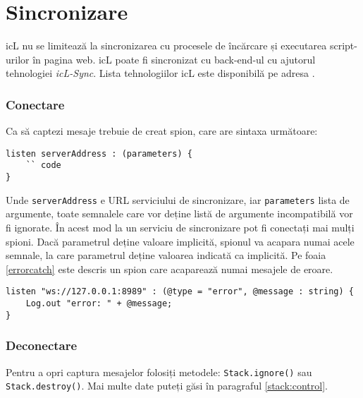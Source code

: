 \section{Sincronizare}
\label{sync}

icL nu se limitează la sincronizarea cu procesele de încărcare și executarea script-urilor în pagina web. icL poate fi sincronizat cu back-end-ul cu ajutorul tehnologiei \textit{icL-Sync}. Lista tehnologiilor icL este disponibilă pe adresa .

\subsubsection{Conectare}

Ca să captezi mesaje trebuie de creat spion, care are sintaxa următoare:
\begin{lstlisting}
listen serverAddress : (parameters) {
	`` code
}
\end{lstlisting}

Unde \texttt{serverAddress} e URL serviciului de sincronizare, iar \texttt{parameters} lista de argumente, toate semnalele care vor deține listă de argumente incompatibilă vor fi ignorate. În acest mod la un serviciu de sincronizare pot fi conectați mai mulți spioni. Dacă parametrul deține valoare implicită, spionul va acapara numai acele semnale, la care parametrul deține valoarea indicată ca implicită. Pe foaia \ref{errorcatch} este descris un spion care acaparează numai mesajele de eroare.


\begin{sourcecode}
\label{errorcatch}
\begin{verbatim}
listen "ws://127.0.0.1:8989" : (@type = "error", @message : string) {
	Log.out "error: " + @message;
}
\end{verbatim}
\end{sourcecode}

\subsubsection{Deconectare}

Pentru a opri captura mesajelor folosiți metodele: \texttt{Stack.ignore()} sau \texttt{Stack.destroy()}. Mai multe date puteți găsi în paragraful \ref{stack:control}.